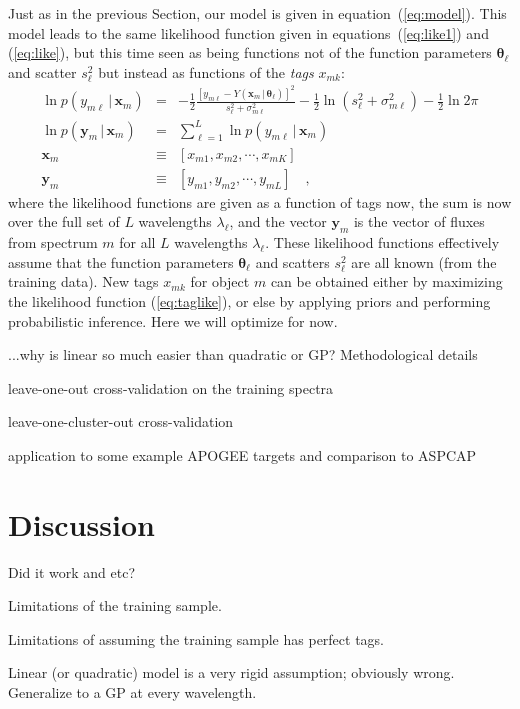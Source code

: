 \documentclass[12pt, preprint]{aastex}
\newcommand{\sectionname}{Section}
\newcommand{\set}[1]{\bm{#1}}
\newcommand{\given}{\,|\,}
\begin{document}
Just as in the previous \sectionname, our model is given in
equation~(\ref{eq:model}).
This model leads to the same likelihood function given in
equations~(\ref{eq:like1}) and (\ref{eq:like}), but this time seen as
being functions not of the function parameters $\set{\theta}_\ell$ and
scatter $s_\ell^2$ but instead as functions of the \emph{tags}
$x_{mk}$:
\begin{eqnarray}
\ln p(y_{m\ell}\given\set{x}_m) &=&
 -\frac{1}{2}\frac{[y_{m\ell} - Y(\set{x}_m\given\set{\theta}_\ell)]^2}{s_\ell^2 + \sigma_{m\ell}^2}
 -\frac{1}{2}\ln(s_\ell^2 + \sigma_{m\ell}^2)
 -\frac{1}{2}\ln 2\pi
\\
\ln p(\set{y}_m\given\set{x}_m) &=&
 \sum_{\ell=1}^L \ln p(y_{m\ell}\given\set{x}_m)
\label{eq:taglike}\\
\set{x}_m &\equiv& [x_{m1}, x_{m2}, \cdots, x_{mK}]
\\
\set{y}_m &\equiv& [y_{m1}, y_{m2}, \cdots, y_{mL}]
\quad,
\end{eqnarray}
where the likelihood functions are given as a function of tags now,
the sum is now over the full set of $L$ wavelengths
$\lambda_\ell$, and the vector $\set{y}_m$ is the vector of fluxes from
spectrum $m$ for all $L$ wavelengths $\lambda_\ell$.
These likelihood functions effectively assume that the function
parameters $\set{\theta}_\ell$ and scatters $s_\ell^2$ are all known (from
the training data).
New tags $x_{mk}$ for object $m$ can be obtained either by maximizing
the likelihood function (\ref{eq:taglike}), or else by applying priors
and performing probabilistic inference.
Here we will optimize for now.

...why is linear so much easier than quadratic or GP?  Methodological details

leave-one-out cross-validation on the training spectra

leave-one-cluster-out cross-validation

application to some example APOGEE targets and comparison to ASPCAP

\section{Discussion}

Did it work and etc?

Limitations of the training sample.

Limitations of assuming the training sample has perfect tags.

Linear (or quadratic) model is a very rigid assumption; obviously wrong.
Generalize to a GP at every wavelength.
\end{document}

